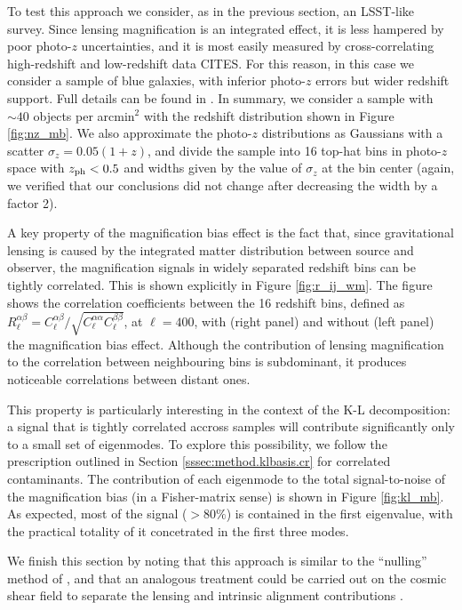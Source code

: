 \documentclass[twocolumn,amsfont,amssymb,amsmath, showpacs,balancelastpage, nofootinbib]{revtex4-1}
\begin{document}
    To test this approach we consider, as in the previous section, an LSST-like survey.  Since lensing magnification is an integrated effect, it is less hampered by poor photo-$z$ uncertainties, and it is most easily measured by cross-correlating high-redshift and low-redshift data CITES. For this reason, in this case we consider a sample of blue galaxies, with inferior photo-$z$ errors but wider redshift support. Full details can be found in \cite{2015ApJ...814..145A}. In summary, we consider a sample with $\sim40$ objects per arcmin$^2$ with the redshift distribution shown in Figure \ref{fig:nz_mb}. We also approximate the photo-$z$ distributions as Gaussians with a scatter $\sigma_z=0.05(1+z)$, and divide the sample into 16 top-hat bins in photo-$z$ space with $z_{\rm ph}<0.5$ and widths given by the value of $\sigma_z$ at the bin center (again, we verified that our conclusions did not change after decreasing the width by a factor 2).
    
    A key property of the magnification bias effect is the fact that, since gravitational lensing is caused by the integrated matter distribution between source and observer, the magnification signals in widely separated redshift bins can be tightly correlated. This is shown explicitly in Figure \ref{fig:r_ij_wm}. The figure shows the correlation coefficients between the 16 redshift bins, defined as $R^{\alpha\beta}_\ell=C^{\alpha\beta}_\ell/\sqrt{C^{\alpha\alpha}_\ell C^{\beta\beta}_\ell}$, at $\ell=400$, with (right panel) and without (left panel) the magnification bias effect. Although the contribution of lensing magnification to the correlation between neighbouring bins is subdominant, it produces noticeable correlations between distant ones.
    
    This property is particularly interesting in the context of the K-L decomposition: a signal that is tightly correlated accross samples will contribute significantly only to a small set of eigenmodes. To explore this possibility, we follow the prescription outlined in Section \ref{sssec:method.klbasis.cr} for correlated contaminants. The contribution of each eigenmode to the total signal-to-noise of the magnification bias (in a Fisher-matrix sense) is shown in Figure \ref{fig:kl_mb}. As expected, most of the signal ($>80\%$) is contained in the first eigenvalue, with the practical totality of it concetrated in the first three modes.
    
    We finish this section by noting that this approach is similar to the ``nulling'' method of \cite{2011MNRAS.415.1681H}, and that an analogous treatment could be carried out on the cosmic shear field to separate the lensing and intrinsic alignment contributions \cite{2008A&A...488..829J}.
\end{document}
